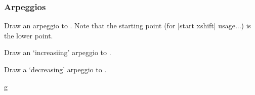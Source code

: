 \subsubsection{Arpeggios}\label{sec:inline:arpeggio-glissando:arpeggio}
\begin{command}{\tmarpeggio{}}
  Draw an arpeggio to . Note that the starting point (for |start xshift| 
  usage...) is the lower point.
\end{command}
\begin{command}{\tmarpeggioup{}}
  Draw an `increasiing' arpeggio to .
\end{command}
\begin{command}{\tmarpeggiodown{}}
  Draw a `decreasing' arpeggio to .
\end{command}
\begin{codeexample}[]
\begin{tmline}
\begin{tmstaff}{g}{}
       
       
\end{tmstaff}
\end{tmline}
\end{codeexample}
